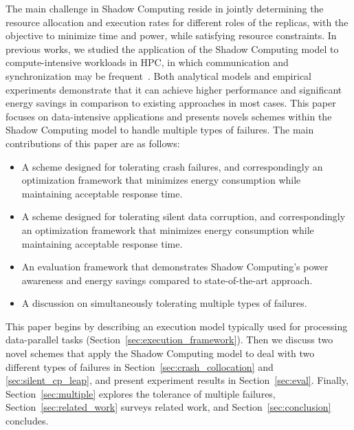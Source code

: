 The main challenge in Shadow Computing reside in jointly determining the resource allocation and execution rates for different roles of the replicas, with the objective to minimize time and power, while satisfying resource constraints. 
In previous works, we studied the application of the Shadow Computing model to compute-intensive workloads in HPC, in which communication and synchronization may be frequent~\cite{6787325,en7085151,7816907}. Both analytical models and empirical experiments demonstrate that it can achieve higher performance and significant energy savings in comparison to existing approaches in most cases. This paper focuses on data-intensive applications and presents novels schemes within the Shadow Computing model to handle multiple types of failures. The main contributions of this paper are as follows:
\begin{itemize}
	\item A scheme designed for tolerating crash failures, and correspondingly an optimization framework that minimizes energy consumption while maintaining acceptable response time.
    \item A scheme designed for tolerating silent data corruption, and correspondingly an optimization framework that minimizes energy consumption while maintaining acceptable response time.
    \item An evaluation framework that demonstrates Shadow Computing's power awareness and energy savings compared to state-of-the-art approach.
    \item A discussion on simultaneously tolerating multiple types of failures. 
\end{itemize}

This paper begins by describing an execution model typically used for processing data-parallel tasks (Section~\ref{sec:execution_framework}). Then we discuss two novel schemes that apply the Shadow Computing model to deal with two different types of failures in Section~\ref{sec:crash_collocation} and \ref{sec:silent_cp_leap}, and present experiment results in Section~\ref{sec:eval}. Finally, Section~\ref{sec:multiple} explores the tolerance of multiple failures, Section~\ref{sec:related_work} surveys related work, and Section~\ref{sec:conclusion} concludes.